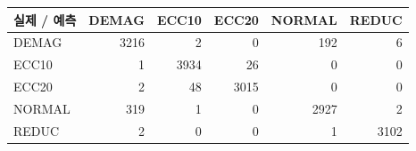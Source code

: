 \begin{tabular}{lrrrrr}
\toprule
실제 / 예측 & DEMAG & ECC10 & ECC20 & NORMAL & REDUC \\
\midrule
DEMAG & 3216 & 2 & 0 & 192 & 6 \\
ECC10 & 1 & 3934 & 26 & 0 & 0 \\
ECC20 & 2 & 48 & 3015 & 0 & 0 \\
NORMAL & 319 & 1 & 0 & 2927 & 2 \\
REDUC & 2 & 0 & 0 & 1 & 3102 \\
\bottomrule
\end{tabular}
